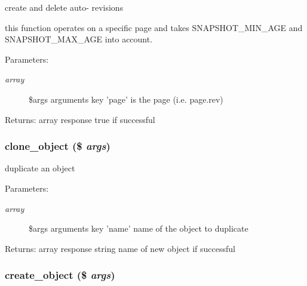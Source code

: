 create and delete auto- revisions

this function operates on a specific page and takes SNAPSHOT\_\-MIN\_\-AGE and SNAPSHOT\_\-MAX\_\-AGE into account. \begin{Desc}
\item[Parameters:]
\begin{description}
\item[{\em array}]\$args arguments key 'page' is the page (i.e. page.rev) \end{description}
\end{Desc}
\begin{Desc}
\item[Returns:]array response true if successful \end{Desc}
\hypertarget{module__glue_8inc_8php_9c7f39d87787ce288ce3d8a3e389ba95}{
\subsubsection[{clone\_\-object}]{\setlength{\rightskip}{0pt plus 5cm}clone\_\-object (\$ {\em args})}}
\label{module__glue_8inc_8php_9c7f39d87787ce288ce3d8a3e389ba95}


duplicate an object

\begin{Desc}
\item[Parameters:]
\begin{description}
\item[{\em array}]\$args arguments key 'name' name of the object to duplicate \end{description}
\end{Desc}
\begin{Desc}
\item[Returns:]array response string name of new object if successful \end{Desc}
\hypertarget{module__glue_8inc_8php_12aa18f28f86274d770ba90aa88e2c3e}{
\subsubsection[{create\_\-object}]{\setlength{\rightskip}{0pt plus 5cm}create\_\-object (\$ {\em args})}}
\label{module__glue_8inc_8php_12aa18f28f86274d770ba90aa88e2c3e}


